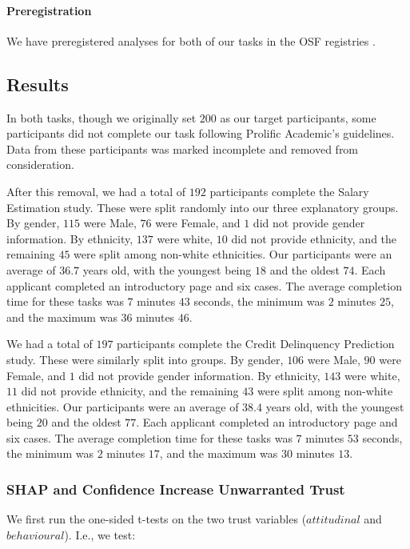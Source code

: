\paragraph{Preregistration}
We have preregistered analyses for both of our tasks in the OSF registries \cite{natarajan_binns_2022}. 

\subsection{Results}\label{ssec:os_results}
In both tasks, though we originally set $200$ as our target participants, some participants did not complete our task following Prolific Academic's guidelines. Data from these participants was marked incomplete and removed from consideration. 

After this removal, we had a total of $192$ participants complete the Salary Estimation study. These were split randomly into our three explanatory groups. By gender, $115$ were Male, $76$ were Female, and $1$ did not provide gender information. By ethnicity, $137$ were white, $10$ did not provide ethnicity, and the remaining $45$ were split among non-white ethnicities. Our participants were an average of $36.7$ years old, with the youngest being $18$ and the oldest $74$. Each applicant completed an introductory page and six cases. The average completion time for these tasks was $7$ minutes $43$ seconds, the minimum was $2$ minutes $25$, and the maximum was $36$ minutes $46$.

We had a total of $197$ participants complete the Credit Delinquency Prediction study. These were similarly split into groups. By gender, $106$ were Male, $90$ were Female, and $1$ did not provide gender information. By ethnicity, $143$ were white, $11$ did not provide ethnicity, and the remaining $43$ were split among non-white ethnicities. Our participants were an average of $38.4$ years old, with the youngest being $20$ and the oldest $77$. Each applicant completed an introductory page and six cases. The average completion time for these tasks was $7$ minutes $53$ seconds, the minimum was $2$ minutes $17$, and the maximum was $30$ minutes $13$.

\subsubsection{SHAP and Confidence Increase Unwarranted Trust}
We first run the one-sided t-tests on the two trust variables ($attitudinal$ and $behavioural$). I.e., we test:

